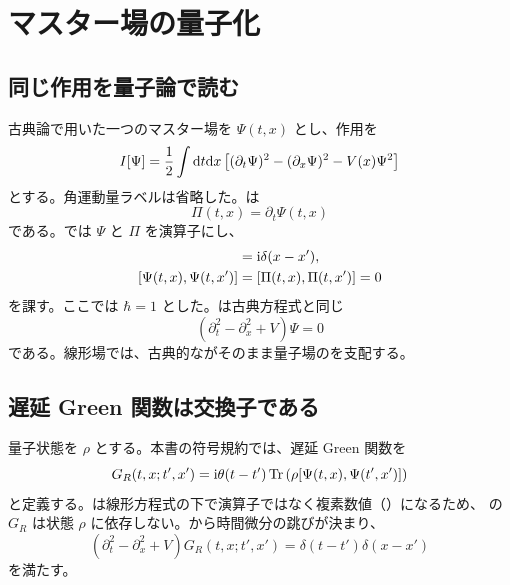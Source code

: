 \chapter{マスター場の量子化}
\label{chap:quantized-master-field}

\section{同じ作用を量子論で読む}

古典論で用いた一つのマスター場を $\Psi(t,x)$ とし、作用を
\begin{equation}
I[\Psi]
=
\frac{1}{2}
\int \mathrm{d} t\mathrm{d} x
\left[
(\partial_t\Psi)^2
-(\partial_x\Psi)^2
-V(x)\Psi^2
\right]
\label{eq:quantum-master-action}
\end{equation}
とする。角運動量ラベルは省略した。は
\begin{equation}
\Pi(t,x)
=
\partial_t\Psi(t,x)
\end{equation}
である。では $\Psi$ と $\Pi$ を演算子にし、
\begin{align}
[\Psi(t,x),\Pi(t,x')]
&=
\rmi\delta(x-x'),
\label{eq:canonical-master-commutator}
\\
[\Psi(t,x),\Psi(t,x')]
&=
[\Pi(t,x),\Pi(t,x')]
=0
\end{align}
を課す。ここでは $\hbar=1$ とした。は古典方程式と同じ
\begin{equation}
\left(
\partial_t^2-\partial_x^2+V
\right)\Psi
=0
\label{eq:quantized-master-eom}
\end{equation}
である。線形場では、古典的ながそのまま量子場のを支配する。

\section{遅延 Green 関数は交換子である}

量子状態を $\rho$ とする。本書の符号規約では、遅延 Green 関数を
\begin{equation}
G_R(t,x;t',x')
=
\mathrm{i}\theta(t-t')
\operatorname{Tr}\left(
\rho[\Psi(t,x),\Psi(t',x')]
\right)
\label{eq:quantum-retarded-green}
\end{equation}
と定義する。は線形方程式の下で演算子ではなく複素数値（）になるため、
の $G_R$ は状態 $\rho$ に依存しない。から時間微分の跳びが決まり、
\begin{equation}
\left(
\partial_t^2-\partial_x^2+V
\right)G_R(t,x;t',x')
=
\delta(t-t')\delta(x-x')
\label{eq:retarded-green-quantum-eom}
\end{equation}
を満たす。

